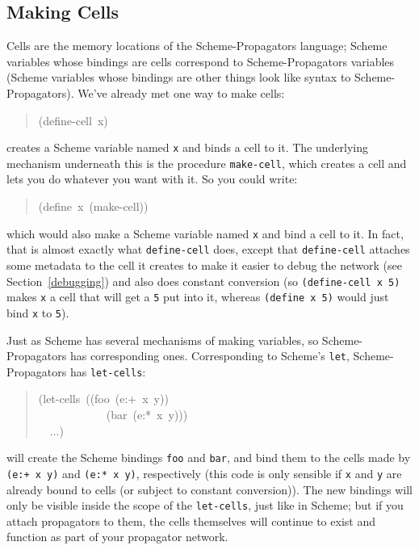 \documentclass[12pt,letterpaper,english]{article}
\begin{document}
\hypertarget{making-cells}{}
\subsection{Making Cells}
\label{making-cells}

Cells are the memory locations of the Scheme-Propagators
language; Scheme variables whose bindings are cells correspond to
Scheme-Propagators variables (Scheme variables whose bindings are
other things look like syntax to Scheme-Propagators).  We've
already met one way to make cells:
\begin{quote}{\ttfamily \raggedright \noindent
(define-cell~x)
}\end{quote}
creates a Scheme variable named \texttt{x} and binds a cell to it.  The
underlying mechanism underneath this is the procedure \texttt{make-cell},
which creates a cell and lets you do whatever you want with it.  So
you could write:
\begin{quote}{\ttfamily \raggedright \noindent
(define~x~(make-cell))
}\end{quote}
which would also make a Scheme variable named \texttt{x} and bind a cell to
it.  In fact, that is almost exactly what \texttt{define-cell} does, except
that \texttt{define-cell} attaches some metadata to the cell it creates to
make it easier to debug the network (see Section~\ref{debugging})
and also does constant
conversion (so \texttt{(define-cell x 5)} makes \texttt{x} a cell that will get
a \texttt{5} put into it, whereas \texttt{(define x 5)} would just bind \texttt{x} to
\texttt{5}).

Just as Scheme has several mechanisms of making variables, so
Scheme-Propagators has corresponding ones.  Corresponding to Scheme's
\texttt{let}, Scheme-Propagators has \texttt{let-cells}:
\begin{quote}{\ttfamily \raggedright \noindent
(let-cells~((foo~(e:+~x~y))~\\
~~~~~~~~~~~~(bar~(e:*~x~y)))~\\
~~...)
}\end{quote}
will create the Scheme bindings \texttt{foo} and \texttt{bar}, and bind them to
the cells made by \texttt{(e:+ x y)} and \texttt{(e:* x y)}, respectively (this
code is only sensible if \texttt{x} and \texttt{y} are already bound to cells
(or subject to constant conversion)).  The new bindings will only be
visible inside the scope of the \texttt{let-cells}, just like in Scheme;
but if you attach propagators to them, the cells themselves will
continue to exist and function as part of your propagator network.
\end{document}

